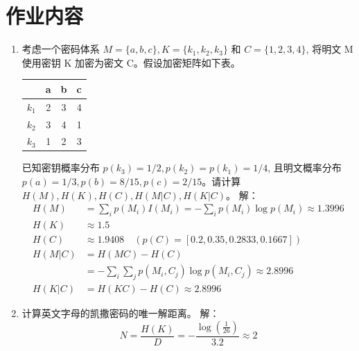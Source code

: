 \documentclass[degree=project,degree-type=project,cjk-font=noto]{thuthesis}
\begin{document}
\maketitle

\frontmatter
% 



\mainmatter

\chapter{作业内容}

\begin{enumerate}
  \setlength{\itemsep}{3\parskip}
  \item 考虑一个密码体系 $M = \{a, b, c\}, K = \{k_1, k_2, k_3\}$ 和 $C = \{1, 2, 3, 4\}$, 将明文 M 使用密钥 K 加密为密文 C。假设加密矩阵如下表。
  \begin{table}[htp]
  	\centering
  	\begin{tabular}{|c|c|c|c|}
  		\hline
  		& a & b & c \\\hline
  		$k_1$ & 2 & 3 & 4 \\\hline
  		$k_2$ & 3 & 4 & 1 \\\hline
  		$k_3$ & 1 & 2 & 3 \\\hline
	\end{tabular}
  \end{table}
  \newline
  已知密钥概率分布 $p(k_3) = 1/2, p(k_2) = p(k_1) = 1/4$, 且明文概率分布 $p(a) = 1/3, p(b) = 8/15, p(c)  = 2/15$。请计算 $H(M), H(K), H(C), H(M|C), H(K|C)$。
  \newline
  {\heiti 解：}
  \begin{align}
  	H(M) &= \sum_i p(M_i) I(M_i) = -\sum_i p(M_i) \log p(M_i) \approx 1.3996 \\
  	H(K) &\approx 1.5 \\
  	H(C) &\approx 1.9408 \quad (p(C) = [0.2, 0.35, 0.2833, 0.1667]) \\
  	H(M|C) &= H(MC) - H(C) \nonumber \\
          &= -\sum_i \sum_j p(M_i, C_j) \log p(M_i, C_j) \approx 2.8996 \\
  	H(K|C) &= H(KC) - H(C) \approx 2.8996
  \end{align}

\item 计算英文字母的凯撒密码的唯一解距离。
\newline
{\heiti 解：}
\newline
\begin{equation}
N = \frac{H(K)}{D} = - \frac{\log\left(\frac{1}{26}\right)}{3.2} \approx 2
\end{equation}
\newline


\end{enumerate}
\end{document}
